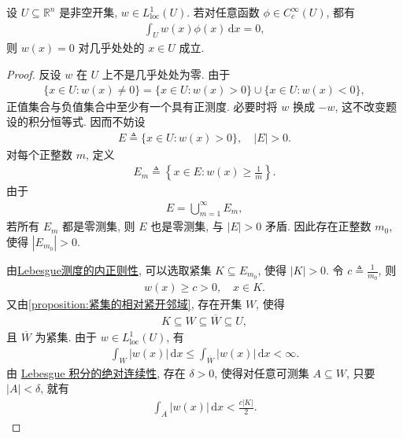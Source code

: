 \documentclass[../../main.tex]{subfiles}
\begin{document}
\begin{lemma}[变分法基本原理]\label{lemma:变分法基本原理}
设 $U\subseteq\mathbb{R}^n$ 是非空开集, $w\in L_{\mathrm{loc}}^1(U)$. 若对任意函数 $\phi\in C_c^\infty(U)$, 都有
\begin{align*}
\int_U w(x)\phi(x)\,\mathrm{d}x=0,
\end{align*}
则 $w(x)=0$ 对几乎处处的 $x\in U$ 成立.
\end{lemma}
\begin{proof}

反设 $w$ 在 $U$ 上不是几乎处处为零. 由于
\begin{align*}
\{x\in U:w(x)\neq 0\}
=
\{x\in U:w(x)>0\}\cup\{x\in U:w(x)<0\},
\end{align*}
正值集合与负值集合中至少有一个具有正测度. 必要时将 $w$ 换成 $-w$, 这不改变题设的积分恒等式. 因而不妨设
\begin{align*}
E\triangleq\{x\in U:w(x)>0\},
\quad |E|>0.
\end{align*}
对每个正整数 $m$, 定义
\begin{align*}
E_m\triangleq
\left\{x\in E:w(x)\geqslant\frac{1}{m}\right\}.
\end{align*}
由于
\begin{align*}
E=\bigcup\limits_{m=1}^{\infty}E_m,
\end{align*}
若所有 $E_m$ 都是零测集, 则 $E$ 也是零测集, 与 $|E|>0$ 矛盾. 因此存在正整数 $m_0$, 使得 $|E_{m_0}|>0$.

由\hyperref[Real Analysis-theorem:Lebesgue测度的内正则性]{Lebesgue测度的内正则性}, 可以选取紧集 $K\subseteq E_{m_0}$, 使得
$|K|>0.$
令 $c\triangleq\frac{1}{m_0}$, 则
\begin{align}
w(x)\geqslant c>0,
\quad x\in K.
\label{eq:variational-positive-on-compact-7b2f}
\end{align}
又由\cref{proposition:紧集的相对紧开邻域}, 存在开集 $W$, 使得
\begin{align*}
K\subseteq W\subseteq\overline{W}\subseteq U,
\end{align*}
且 $\overline{W}$ 为紧集. 由于 $w\in L_{\mathrm{loc}}^1(U)$, 有
\begin{align*}
\int_W|w(x)|\,\mathrm{d}x
\leqslant
\int_{\overline{W}}|w(x)|\,\mathrm{d}x
<\infty.
\end{align*}
由 \hyperref[Real Analysis-theorem:积分的绝对连续性]{Lebesgue 积分的绝对连续性}, 存在 $\delta>0$, 使得对任意可测集 $A\subseteq W$, 只要 $|A|<\delta$, 就有
\begin{align}
\int_A|w(x)|\,\mathrm{d}x
<\frac{c|K|}{2}.
\label{eq:variational-absolute-continuity-4e9a}
\end{align}


\end{proof}
\end{document}
